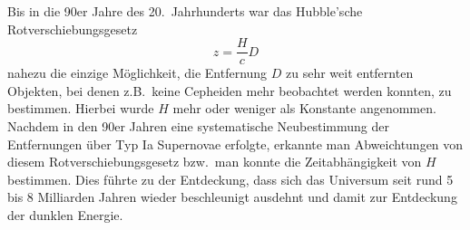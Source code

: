 Bis in die 90er Jahre des 20.\ Jahrhunderts war das Hubble'sche Rotverschiebungsgesetz 
\begin{equation}
                   z = \frac{H}{c} D  
\end{equation}
nahezu die einzige M\"oglichkeit, die Entfernung $D$ zu sehr weit entfernten Objekten, bei denen
z.B.\ keine Cepheiden mehr beobachtet werden konnten, zu bestimmen. Hierbei wurde $H$ mehr oder
weniger als Konstante angenommen. Nachdem in den 90er Jahren
eine systematische Neubestimmung der Entfernungen \"uber Typ Ia Supernovae erfolgte, erkannte
man Abweichtungen von diesem Rotverschiebungsgesetz bzw.\ man konnte die Zeitabh\"angigkeit von
$H$ bestimmen. Dies f\"uhrte zu der Entdeckung, dass sich das Universum seit rund 5 bis 8 Milliarden
Jahren wieder beschleunigt ausdehnt und damit zur Entdeckung der dunklen Energie.  

%

